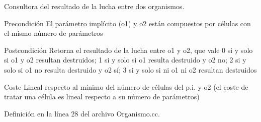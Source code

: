 Consultora del resultado de la lucha entre dos organismos. 

\begin{DoxyPrecond}{Precondición}
El parámetro implícito (o1) y o2 están compuestos por células con el mismo número de parámetros 
\end{DoxyPrecond}
\begin{DoxyPostcond}{Postcondición}
Retorna el resultado de la lucha entre o1 y o2, que vale 0 si y solo si o1 y o2 resultan destruidos; 1 si y solo si o1 resulta destruido y o2 no; 2 si y solo si o1 no resulta destruido y o2 sí; 3 si y solo si ni o1 ni o2 resultan destruidos 
\end{DoxyPostcond}
\begin{DoxyParagraph}{Coste}
Lineal respecto al mínimo del número de células del p.\+i. y o2 (el coste de tratar una célula es lineal respecto a su número de parámetros) 
\end{DoxyParagraph}


Definición en la línea 28 del archivo Organismo.\+cc.


